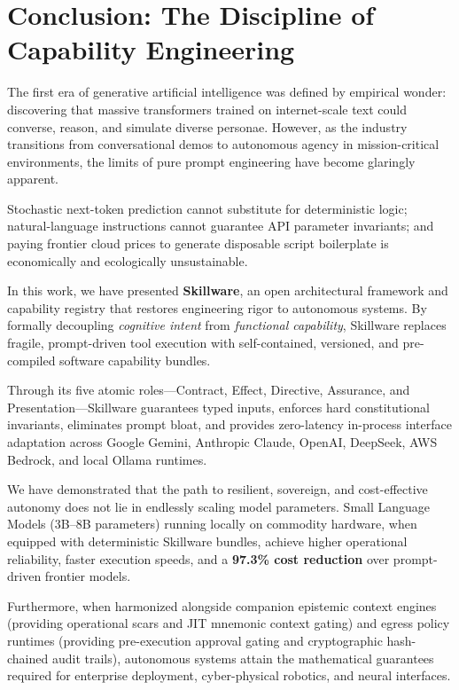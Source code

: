 
\section{Conclusion: The Discipline of Capability Engineering}
\label{sec:conclusion}

The first era of generative artificial intelligence was defined by empirical wonder: discovering that massive transformers trained on internet-scale text could converse, reason, and simulate diverse personae. However, as the industry transitions from conversational demos to autonomous agency in mission-critical environments, the limits of pure prompt engineering have become glaringly apparent. 

Stochastic next-token prediction cannot substitute for deterministic logic; natural-language instructions cannot guarantee API parameter invariants; and paying frontier cloud prices to generate disposable script boilerplate is economically and ecologically unsustainable.

In this work, we have presented \textbf{Skillware}, an open architectural framework and capability registry that restores engineering rigor to autonomous systems. By formally decoupling \emph{cognitive intent} from \emph{functional capability}, Skillware replaces fragile, prompt-driven tool execution with self-contained, versioned, and pre-compiled software capability bundles. 

Through its five atomic roles---Contract, Effect, Directive, Assurance, and Presentation---Skillware guarantees typed inputs, enforces hard constitutional invariants, eliminates prompt bloat, and provides zero-latency in-process interface adaptation across Google Gemini, Anthropic Claude, OpenAI, DeepSeek, AWS Bedrock, and local Ollama runtimes.

We have demonstrated that the path to resilient, sovereign, and cost-effective autonomy does not lie in endlessly scaling model parameters. Small Language Models (3B--8B parameters) running locally on commodity hardware, when equipped with deterministic Skillware bundles, achieve higher operational reliability, faster execution speeds, and a \textbf{97.3\% cost reduction} over prompt-driven frontier models. 

Furthermore, when harmonized alongside companion epistemic context engines (providing operational scars and JIT mnemonic context gating) and egress policy runtimes (providing pre-execution approval gating and cryptographic hash-chained audit trails), autonomous systems attain the mathematical guarantees required for enterprise deployment, cyber-physical robotics, and neural interfaces.

